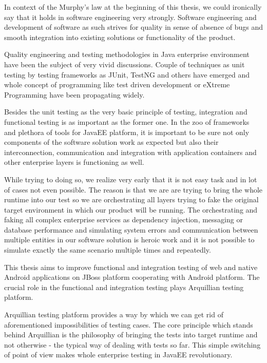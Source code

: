 \documentclass[12pt,final,oneside]{fithesis}
\begin{document}
In context of the Murphy's law at the beginning of this thesis, we could ironically say that it holds in software engineering very strongly. Software engineering and development of software as such strives for quality in sense of absence of bugs and smooth integration into existing solutions or functionality of the product.

Quality engineering and testing methodologies in Java enterprise environment have been the subject of very vivid discussions. Couple of techniques as unit testing by testing frameworks as JUnit, TestNG and others have emerged and whole concept of programming like test driven development or eXtreme Programming have been propagating widely. 

Besides the unit testing as the very basic principle of testing, integration and functional testing is as important as the former one. In the zoo of frameworks and plethora of tools for JavaEE platform, it is important to be sure not only components of the software solution work as expected but also their interconnection, communication and integration with application containers and other enterprise layers is functioning as well.

While trying to doing so, we realize very early that it is not easy task and in lot of cases not even possible. The reason is that we are are trying to bring the whole runtime into our test so we are orchestrating all layers trying to fake the original target environment in which our product will be running. The orchestrating and faking all complex enterprise services as dependency injection, messaging or database performance and simulating system errors and communication between multiple entities in our software solution is heroic work and it is not possible to simulate exactly the same scenario multiple times and repeatedly.

This thesis aims to improve functional and integration testing of web and native Android applications on JBoss platform cooperating with Android platform. The crucial role in the functional and integration testing plays Arquillian testing platform.

Arquillian testing platform provides a way by which we can get rid of aforementioned impossibilities of testing cases. The core principle which stands behind Arquillian is the philosophy of bringing the tests into target runtime and not otherwise - the typical way of dealing with tests so far. This simple switching of point of view makes whole enterprise testing in JavaEE revolutionary. 
\end{document}

